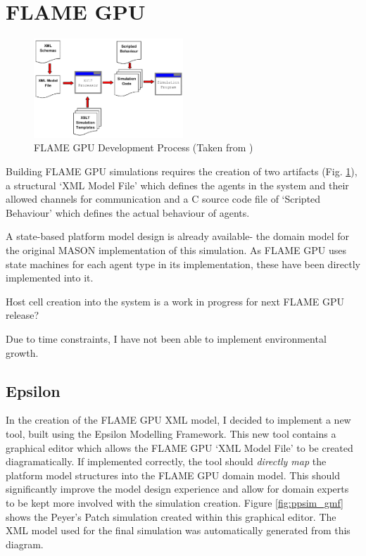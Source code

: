 \documentclass{UoYCSproject}
\begin{document}
\section{\gls{FLAME GPU}}

\begin{figure}
\includegraphics[width=0.5\textwidth]{Appendix/FLAME_Process}
\caption{\gls{FLAME GPU} Development Process (Taken from \cite{flame_simulation})}
\label{fig:flame_dev}
\end{figure}

Building \gls{FLAME GPU} simulations requires the creation of two artifacts (Fig. \ref{fig:flame_dev}), a structural `XML Model File' which defines the agents in the system and their allowed channels for communication and a C source code file of `Scripted Behaviour' which defines the actual behaviour of agents.

A state-based platform model design is already available- the domain model for the original \gls{MASON} implementation of this simulation.
As \gls{FLAME GPU} uses state machines for each agent type in its implementation, these have been directly implemented into it.

Host cell creation into the system is a work in progress for next \gls{FLAME GPU} release?

Due to time constraints, I have not been able to implement environmental growth.

\subsection{Epsilon}
In the creation of the \gls{FLAME GPU} XML model, I decided to implement a new tool, built using the Epsilon Modelling Framework.
This new tool contains a graphical editor which allows the \gls{FLAME GPU} `XML Model File' to be created diagramatically.
If implemented correctly, the tool should \textit{directly map} the platform model structures into the \gls{FLAME GPU} domain model.
This should significantly improve the model design experience and allow for domain experts to be kept more involved with the simulation creation.
Figure \ref{fig:ppsim_gmf} shows the Peyer's Patch simulation created within this graphical editor. The XML model used for the final simulation was automatically generated from this diagram.
\end{document}

